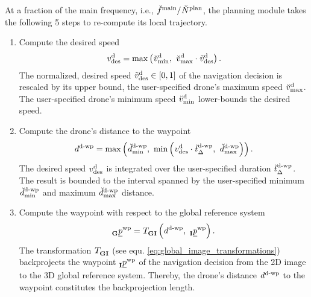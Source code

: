 At a fraction of the main frequency, i.e.,
$\freq[\user]{\main}{}{}{} / \num[\user]{\text{plan}}{}{}{}$, 
the planning module takes the following 5 steps 
to re-compute its local trajectory.
\begin{enumerate}
    \item Compute the desired speed
    \begin{equation}
        \speed[]{\drone}{\desired}{}{}
        = 
        \maxof{
            \speed[\user]{\drone}{\mnm}{}{}
        }{
            \speed[\user]{\drone}{\mxm}{}{}
            \cdot 
            \speed[\norm]{\drone}{\desired}{}{}
        }.
    \end{equation}
    The normalized, desired speed 
    $\speed[\norm]{\drone}{\desired}{}{} \in \left[0, 1\right]$ 
    of the navigation decision
    is rescaled by its upper bound, 
    the user-specified drone's maximum speed 
    $\speed[\user]{\drone}{\mxm}{}{}$.    
    The user-specified drone's minimum speed 
    $\speed[\user]{\drone}{\mnm}{}{}$
    lower-bounds the desired speed.

    \item Compute the drone's distance to the waypoint 
    \begin{equation}
        \dist[]{\dronetowayp}{}{}{}
        = 
        \maxof{
            \dist[\user]{\dronetowayp}{\mnm}{}{}
        }{
            \minof{
                \speed[]{\drone}{\desired}{}{}
                \cdot
                \dur[\user]{\dronetowayp}{}{}{}
            }{
                \dist[\user]{\dronetowayp}{\mxm}{}{}
            }
        }.
    \end{equation}
    The desired speed 
    $\speed[]{\drone}{\desired}{}{}$ 
    is integrated over the user-specified duration
    $\dur[\user]{\dronetowayp}{}{}{}$.
    The result is bounded to the interval spanned 
    by the user-specified minimum
    $\dist[\user]{\dronetowayp}{\mnm}{}{}$
    and maximum
    $\dist[\user]{\dronetowayp}{\mxm}{}{}$
    distance.

    \item Compute the waypoint with respect to the global reference system
    \begin{equation} \label{eq:pl_global_wayp}
        \pos[]{\wayp}{}{\grs}{}
        = 
        \trafo[]{}{\grs\irs}{}{} \left(
            \dist[]{\dronetowayp}{}{}{}
            ,\ 
            \pos[]{\wayp}{}{\irs}{}
        \right).
    \end{equation}
    The transformation
    $\trafo[]{}{\grs\irs}{}{}$
    (see equ. \ref{eq:global_image_transformations})
    backprojects the waypoint
    $\pos[]{\wayp}{}{\irs}{}$ 
    of the navigation decision
    from the 2D image to the 3D global reference system.
    Thereby, the drone's distance 
    $\dist[]{\dronetowayp}{}{}{}$
    to the waypoint
    constitutes the backprojection length.
    

\end{enumerate}
